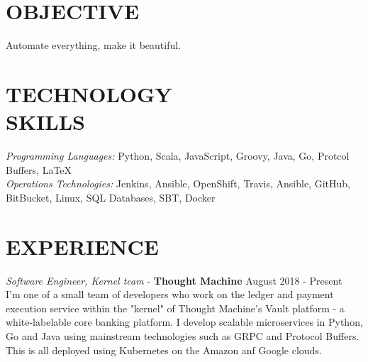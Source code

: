 \documentclass[margin, 10pt]{res} %
\begin{document}
    \begin{resume}


        \section{OBJECTIVE}

        Automate everything, make it beautiful.


        \section{TECHNOLOGY \\ SKILLS}

        {\sl Programming Languages:} Python, Scala, JavaScript, Groovy, Java, Go, Protcol Buffers, \LaTeX \\
        {\sl Operations Technologies:} Jenkins, Ansible, OpenShift, Travis, Ansible, GitHub, BitBucket, Linux, SQL Databases, SBT, Docker\\


        \section{EXPERIENCE}

        {\sl Software Engineer, Kernel team} - \textbf{Thought Machine} \hfill August 2018 - Present \\

         I'm one of a small team of developers who work on the ledger and payment execution service within the "kernel" of Thought
         Machine's Vault platform - a white-labelable core banking platform. I develop scalable microservices in Python, Go
         and Java using mainstream technologies such as GRPC and Protocol Buffers. This is all deployed using Kubernetes
         on the Amazon anf Google clouds.


\end{resume}
\end{document}
